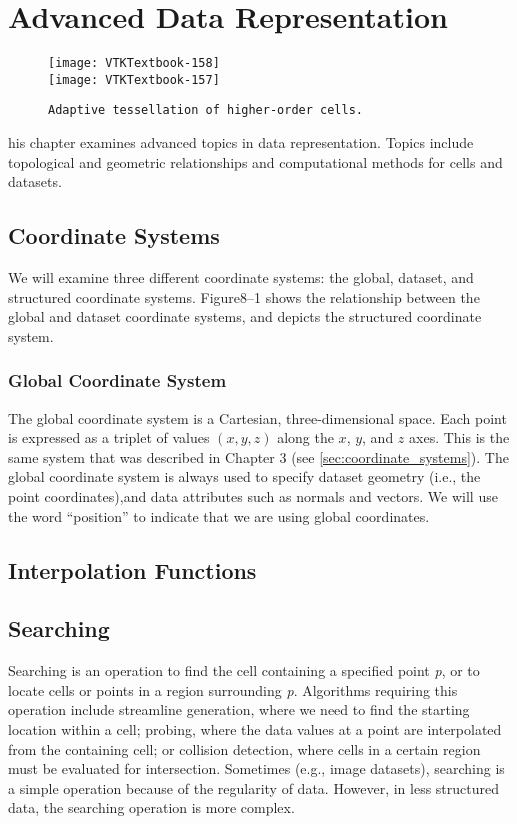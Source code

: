 \chapter{Advanced Data Representation}
\label{chap:advanced_data_representation}

\begin{figure}[ht]
	\hfill
	\begin{minipage}{0.5\textwidth}
		\centering
		\texttt{[image: VTKTextbook-158]}\\
		\texttt{[image: VTKTextbook-157]}
		\caption*{\texttt{Adaptive tessellation of higher-order cells.}}
	\end{minipage}
\end{figure}


his chapter examines advanced topics in data representation.
Topics include topological and geometric relationships and computational methods for cells and datasets.

\section{Coordinate Systems}
We will examine three different coordinate systems: the global, dataset, and structured coordinate systems.
Figure8–1 shows the relationship between the global and dataset coordinate systems, and depicts the structured coordinate system.

\subsection{Global Coordinate System}
The global coordinate system is a Cartesian, three-dimensional space. Each point is expressed as a triplet of values $(x,y,z)$ along the $x$, $y$, and $z$ axes.
This is the same system that was described in Chapter 3 (see \ref{sec:coordinate_systems}).
The global coordinate system is always used to specify dataset geometry (i.e., the point coordinates),and data attributes such as normals and vectors.
We will use the word ``position'' to indicate that we are using global coordinates.

\section{Interpolation Functions}
\label{sec:interpolation_functions}


\section{Searching}
\label{sec:searching}
Searching is an operation to find the cell containing a specified point \emph{p}, or to locate cells or points in a region surrounding \emph{p}.
Algorithms requiring this operation include streamline generation, where we need to find the starting location within a cell; probing, where the data values at a point are interpolated from the containing cell; or collision detection, where cells in a certain region must be evaluated for intersection.
Sometimes (e.g., image datasets), searching is a simple operation because of the regularity of data. However, in less structured data, the searching operation is more complex.

